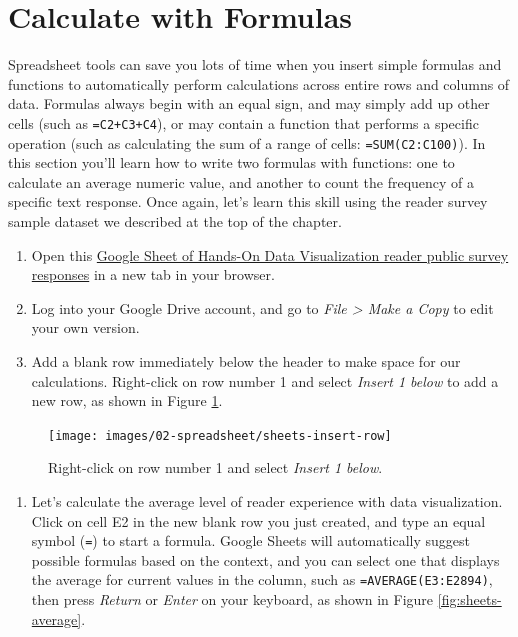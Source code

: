 \documentclass[
  english,
]{book}
\providecommand{\tightlist}{%
  \setlength{\itemsep}{0pt}\setlength{\parskip}{0pt}}
\begin{document}
\hypertarget{calculate}{%
\section*{Calculate with Formulas}\label{calculate}}

Spreadsheet tools can save you lots of time when you insert simple formulas and functions to automatically perform calculations across entire rows and columns of data. Formulas always begin with an equal sign, and may simply add up other cells (such as \texttt{=C2+C3+C4}), or may contain a function that performs a specific operation (such as calculating the sum of a range of cells: \texttt{=SUM(C2:C100)}). In this section you'll learn how to write two formulas with functions: one to calculate an average numeric value, and another to count the frequency of a specific text response. Once again, let's learn this skill using the reader survey sample dataset we described at the top of the chapter.

\begin{enumerate}
\def\labelenumi{\arabic{enumi}.}
\item
  Open this \href{https://docs.google.com/spreadsheets/d/1egX_akJccnCSzdk1aaDdtrEGe5HcaTrlOW-Yf6mJ3Uo}{Google Sheet of Hands-On Data Visualization reader public survey responses} in a new tab in your browser.
\item
  Log into your Google Drive account, and go to \emph{File \textgreater{} Make a Copy} to edit your own version.
\item
  Add a blank row immediately below the header to make space for our calculations. Right-click on row number 1 and select \emph{Insert 1 below} to add a new row, as shown in Figure \ref{fig:sheets-insert-row}.
\end{enumerate}



\begin{figure}
\texttt{[image: images/02-spreadsheet/sheets-insert-row]} \caption{Right-click on row number 1 and select \emph{Insert 1 below}.}\label{fig:sheets-insert-row}
\end{figure}

\begin{enumerate}
\def\labelenumi{\arabic{enumi}.}
\setcounter{enumi}{3}
\tightlist
\item
  Let's calculate the average level of reader experience with data visualization. Click on cell E2 in the new blank row you just created, and type an equal symbol (\texttt{=}) to start a formula. Google Sheets will automatically suggest possible formulas based on the context, and you can select one that displays the average for current values in the column, such as \texttt{=AVERAGE(E3:E2894)}, then press \emph{Return} or \emph{Enter} on your keyboard, as shown in Figure \ref{fig:sheets-average}.
\end{enumerate}
\end{document}

